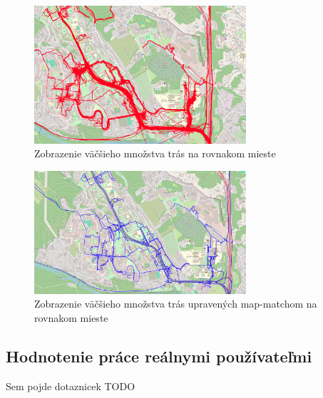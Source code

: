 \begin{figure}[H]
  \centering
  \includegraphics[width=0.7\textwidth]{img/map-match rozdiel/pred map-match.png}
  \caption{Zobrazenie väčšieho množstva trás na rovnakom mieste}
  \label{fig:spagety}
\end{figure}
\begin{figure}[H]
  \centering
  \includegraphics[width=0.7\textwidth]{img/map-match rozdiel/po map-match.png}
  \caption{Zobrazenie väčšieho množstva trás upravených map-matchom na rovnakom mieste}
  \label{fig:niespagety}
\end{figure}

\pagebreak
\subsection{Hodnotenie práce reálnymi používateľmi}
Sem pojde dotaznicek TODO

